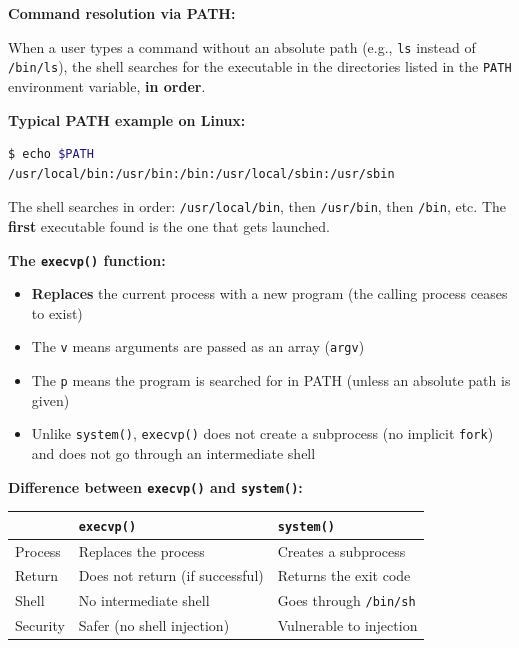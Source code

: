 \documentclass[a4paper,11pt]{article}
\theoremstyle{plain}
\theoremstyle{definition}
\begin{document}
\begin{rappel}
\textbf{Command resolution via PATH:}

When a user types a command without an absolute path (e.g., \texttt{ls} instead of \texttt{/bin/ls}), the shell searches for the executable in the directories listed in the \texttt{PATH} environment variable, \textbf{in order}.

\medskip
\textbf{Typical PATH example on Linux:}
\begin{lstlisting}[numbers=none,language=bash]
$ echo $PATH
/usr/local/bin:/usr/bin:/bin:/usr/local/sbin:/usr/sbin
\end{lstlisting}

The shell searches in order: \texttt{/usr/local/bin}, then \texttt{/usr/bin}, then \texttt{/bin}, etc. The \textbf{first} executable found is the one that gets launched.

\medskip
\textbf{The \texttt{execvp()} function:}
\begin{itemize}
    \item \textbf{Replaces} the current process with a new program (the calling process ceases to exist)
    \item The \texttt{v} means arguments are passed as an array (\texttt{argv})
    \item The \texttt{p} means the program is searched for in PATH (unless an absolute path is given)
    \item Unlike \texttt{system()}, \texttt{execvp()} does not create a subprocess (no implicit \texttt{fork}) and does not go through an intermediate shell
\end{itemize}

\medskip
\textbf{Difference between \texttt{execvp()} and \texttt{system()}:}

\begin{center}
\begin{tabular}{lll}
\toprule
& \texttt{execvp()} & \texttt{system()} \\
\midrule
Process & Replaces the process & Creates a subprocess \\
Return & Does not return (if successful) & Returns the exit code \\
Shell & No intermediate shell & Goes through \texttt{/bin/sh} \\
Security & Safer (no shell injection) & Vulnerable to injection \\
\bottomrule
\end{tabular}
\end{center}
\end{rappel}
\end{document}
